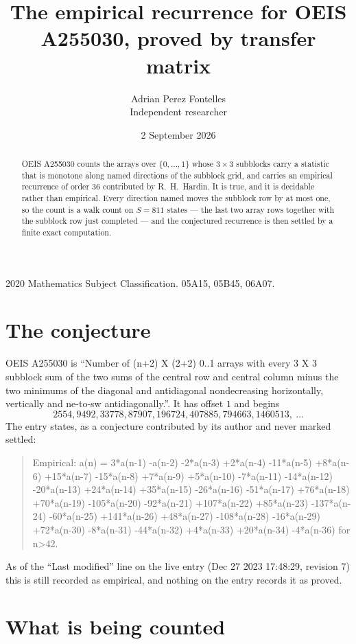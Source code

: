 \documentclass[11pt,a4paper]{article}
\title{The empirical recurrence for OEIS A255030, proved by transfer matrix}
\author{Adrian Perez Fontelles\\ \small Independent researcher}
\date{2 September 2026}
\theoremstyle{plain}
\theoremstyle{definition}
\begin{document}
\maketitle

\begin{abstract}
OEIS A255030 counts the arrays over $\{0,\dots,1\}$ whose $3\times3$ subblocks carry a
statistic that is monotone along named directions of the subblock grid, and carries an
empirical recurrence of order $36$ contributed by R.~H.~Hardin. It is true, and it is
decidable rather than empirical. Every direction named moves the subblock row by at most one,
so the count is a walk count on $S=811$ states --- the last two array rows together with the
subblock row just completed --- and the conjectured recurrence is then settled by a finite
exact computation.
\end{abstract}

\noindent\small 2020 Mathematics Subject Classification. 05A15, 05B45, 06A07.\normalsize

\section{The conjecture}

OEIS A255030 is ``Number of (n+2) X (2+2) 0..1 arrays with every 3 X 3 subblock sum of the two sums of the central row and central column minus the two minimums of the diagonal and antidiagonal nondecreasing horizontally, vertically and ne-to-sw antidiagonally.''. It has offset $1$ and begins
\[
2554, 9492, 33778, 87907, 196724, 407885, 794663, 1460513,\ \dots
\]
The entry states, as a conjecture contributed by its author and never marked settled:
\begin{quote}
Empirical: a(n) = 3*a(n-1) -a(n-2) -2*a(n-3) +2*a(n-4) -11*a(n-5) +8*a(n-6) +15*a(n-7) -15*a(n-8) +7*a(n-9) +5*a(n-10) -7*a(n-11) -14*a(n-12) -20*a(n-13) +24*a(n-14) +35*a(n-15) -26*a(n-16) -51*a(n-17) +76*a(n-18) +70*a(n-19) -105*a(n-20) -92*a(n-21) +107*a(n-22) +85*a(n-23) -137*a(n-24) -60*a(n-25) +141*a(n-26) +48*a(n-27) -108*a(n-28) -16*a(n-29) +72*a(n-30) -8*a(n-31) -44*a(n-32) +4*a(n-33) +20*a(n-34) -4*a(n-36) for n>42.
\end{quote}
As of the ``Last modified'' line on the live entry (Dec 27 2023 17:48:29, revision 7) this is still
recorded as empirical, and nothing on the entry records it as proved.

\section{What is being counted}
\end{document}

